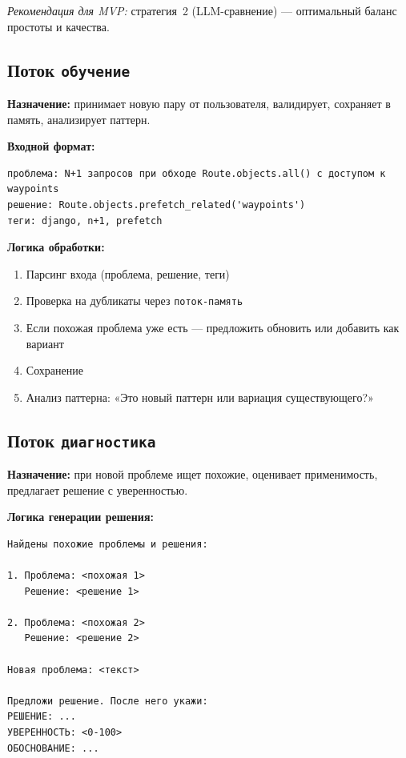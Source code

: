 \documentclass[12pt, a4paper, twoside]{article}
\begin{document}
\textit{Рекомендация для MVP:} стратегия~2 (LLM-сравнение) --- оптимальный
баланс простоты и качества.

\subsection{Поток \texttt{обучение}}

\textbf{Назначение:} принимает новую пару от пользователя, валидирует, сохраняет в память, анализирует паттерн.

\textbf{Входной формат:}
\begin{lstlisting}[language={},numbers=none]
проблема: N+1 запросов при обходе Route.objects.all() с доступом к waypoints
решение: Route.objects.prefetch_related('waypoints')
теги: django, n+1, prefetch
\end{lstlisting}

\textbf{Логика обработки:}
\begin{enumerate}[leftmargin=1.5em]
  \item Парсинг входа (проблема, решение, теги)
  \item Проверка на дубликаты через \texttt{поток-память}
  \item Если похожая проблема уже есть --- предложить обновить или добавить как вариант
  \item Сохранение
  \item Анализ паттерна: «Это новый паттерн или вариация существующего?»
\end{enumerate}

\subsection{Поток \texttt{диагностика}}

\textbf{Назначение:} при новой проблеме ищет похожие, оценивает применимость, предлагает решение с уверенностью.

\textbf{Логика генерации решения:}

\begin{lstlisting}[language={},numbers=none,caption={Структура промпта диагностики}]
Найдены похожие проблемы и решения:

1. Проблема: <похожая 1>
   Решение: <решение 1>

2. Проблема: <похожая 2>
   Решение: <решение 2>

Новая проблема: <текст>

Предложи решение. После него укажи:
РЕШЕНИЕ: ...
УВЕРЕННОСТЬ: <0-100>
ОБОСНОВАНИЕ: ...
\end{lstlisting}
\end{document}

